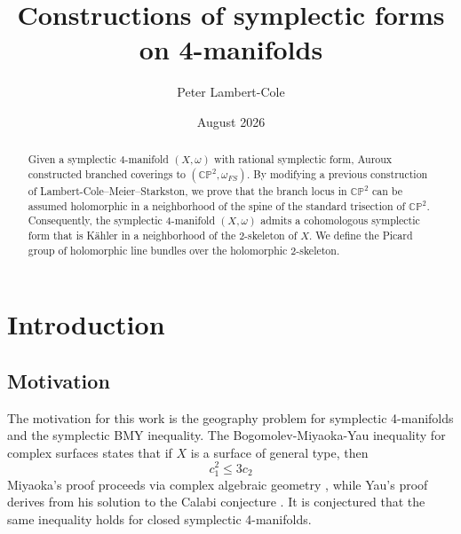 \documentclass[11pt]{amsart}
\theoremstyle{definition}
\theoremstyle{remark}
\numberwithin{equation}{section}
\newcommand{\CP}{\mathbb{CP}}
\begin{document}
\title{Constructions of symplectic forms on 4-manifolds}
\date{August 2026}
\author{Peter Lambert-Cole}
\address{Department of Mathematics, University of Georgia, Athens, GA 30602}



\subjclass[2010]{}


\dedicatory{}

\begin{abstract}

Given a symplectic 4-manifold $(X,\omega)$ with rational symplectic form, Auroux constructed branched coverings to $(\CP^2,\omega_{FS})$.  By modifying a previous construction of Lambert-Cole--Meier--Starkston, we prove that the branch locus in $\CP^2$ can be assumed holomorphic in a neighborhood of the spine of the standard trisection of $\CP^2$.  Consequently, the symplectic 4-manifold $(X,\omega)$ admits a cohomologous symplectic form that is K\"ahler in a neighborhood of the 2-skeleton of $X$.  We define the Picard group of holomorphic line bundles over the holomorphic 2-skeleton.
\end{abstract}

\maketitle



\section{Introduction}

\subsection{Motivation}

The motivation for this work is the geography problem for symplectic 4-manifolds and the symplectic BMY inequality.  The Bogomolev-Miyaoka-Yau inequality for complex surfaces states that if $X$ is a surface of general type, then
\begin{equation}
    \label{eq:BMY}
    c_1^2 \leq 3 c_2
\end{equation}
Miyaoka's proof proceeds via complex algebraic geometry \cite{Miyaoka}, while Yau's proof derives from his solution to the Calabi conjecture \cite{Yau}.  It is conjectured that the same inequality holds for closed symplectic 4-manifolds.  
\end{document}
